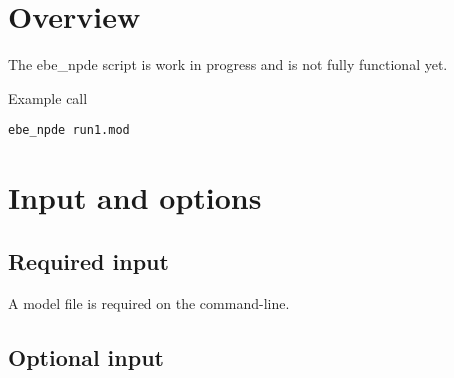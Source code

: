 



\maketitle


\section{Overview}

The ebe\_npde script is work in progress and is not fully functional yet.

Example call
\begin{verbatim}
ebe_npde run1.mod
\end{verbatim}

\section{Input and options}

\subsection{Required input}

A model file is required on the command-line.

\subsection{Optional input}

